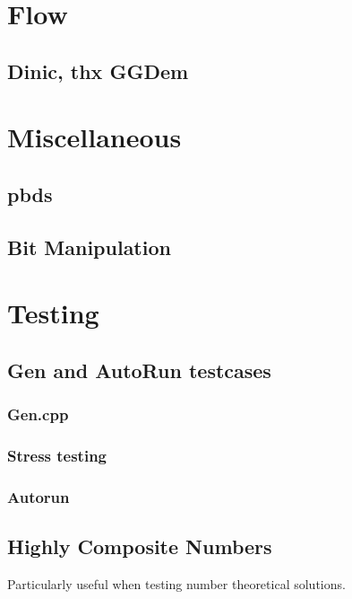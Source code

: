 \section{Flow}
\subsection{Dinic, thx GGDem}

\section{Miscellaneous}
\subsection{pbds}
\subsection{Bit Manipulation}


\section{Testing}
\subsection{Gen and AutoRun testcases}
\subsubsection{Gen.cpp}
\subsubsection{Stress testing}

\subsubsection{Autorun}

\subsection{Highly Composite Numbers}
Particularly useful when testing number theoretical solutions.





